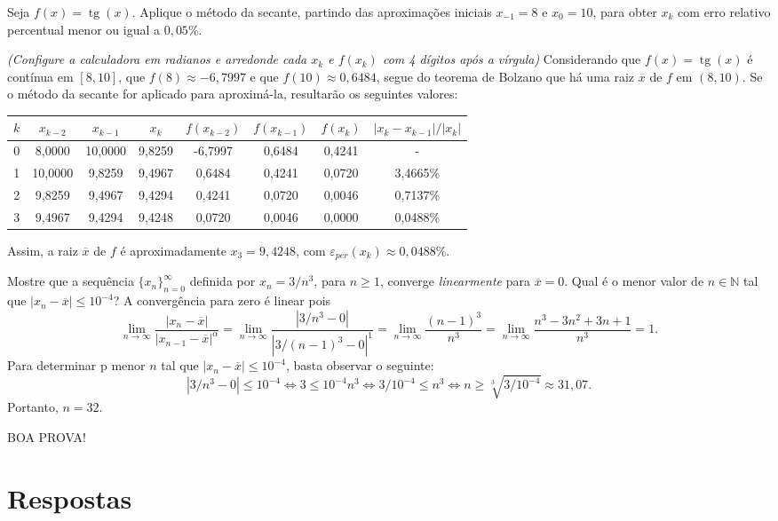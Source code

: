 \documentclass[12pt,a4paper]{article}
\newcommand*\tg{\operatorname{tg}}
\begin{document}
\begin{ExerciseList}
\Exercise[title={2,5}]
Seja $f(x) = \tg(x)$. Aplique o método da secante, partindo das aproximações iniciais $x_{-1} = 8$ e $x_0 = 10$, para obter $x_k$ com erro relativo percentual menor ou igual a $0,05\%$.

\textit{(Configure a calculadora em radianos e arredonde cada $x_k$ e $f(x_k)$ com 4 dígitos após a vírgula)}
\Answer
Considerando que $f(x) = \tg(x)$ é contínua em $[8, 10]$, que $f(8) \approx -6,7997$ e que $f(10) \approx 0,6484$, segue do teorema de Bolzano que há uma raiz $\overline{x}$ de $f$ em $(8, 10)$. Se o método da secante for aplicado para aproximá-la, resultarão os seguintes valores:
\medskip
\begin{center}
\begin{tabular}{cccccccc}
\hline
$k$ & $x_{k-2}$ & $x_{k-1}$ & $x_k$ & $f(x_{k-2})$ & $f(x_{k-1})$ & $f(x_k)$ & $|x_k-x_{k-1}|/|x_k|$ \\
\hline
0 & 8,0000 & 10,0000 & 9,8259 & -6,7997 & 0,6484 & 0,4241 & - \\
1 & 10,0000 & 9,8259 & 9,4967 & 0,6484 & 0,4241 & 0,0720 & 3,4665\%\\
2 & 9,8259 & 9,4967 & 9,4294 & 0,4241 & 0,0720 & 0,0046 & 0,7137\%\\
3 & 9,4967 & 9,4294 & 9,4248 & 0,0720 & 0,0046 & 0,0000 & 0,0488\%\\
\hline
\end{tabular}
\end{center}
\medskip
Assim, a raiz $\overline{x}$ de $f$ é aproximadamente $x_3 = 9,4248$, com $\varepsilon_{per}(x_k) \approx 0,0488\%$.


\Exercise[title={2,5}]
Mostre que a sequência $\{x_n\}_{n=0}^\infty$ definida por $x_n = 3/n^3$, para $n \geq 1$, converge \textit{linearmente} para $\overline{x} = 0$. Qual é o menor valor de $n \in \mathbb{N}$ tal que $|x_n - \overline{x}| \leq 10^{-4}$?
\Answer A convergência para zero é linear pois
\[
\lim_{n \to \infty} \frac{|x_n - \overline{x}|}{|x_{n-1} - \overline{x}|^\alpha}
= \lim_{n \to \infty} \frac{|3/n^3 - 0|}{|3/(n-1)^3 - 0|^1}
= \lim_{n \to \infty} \frac{(n-1)^3}{n^3}
= \lim_{n \to \infty} \frac{n^3-3n^2+3n+1}{n^3}
= 1.
\]
Para determinar p menor $n$ tal que $|x_n - \overline{x}| \leq 10^{-4}$, basta observar o seguinte:
\[
|3/n^3 - 0| \leq 10^{-4}
\Leftrightarrow
3 \leq 10^{-4} n^3
\Leftrightarrow
3/10^{-4} \leq n^3
\Leftrightarrow
n \geq \sqrt[3]{3/10^{-4}} \approx 31,07.
\]
Portanto, $n = 32$.
\end{ExerciseList}

\vfill
\begin{center}
BOA PROVA!
\end{center}

\newpage
\restoregeometry
\section*{Respostas}
\shipoutAnswer
\end{document}
